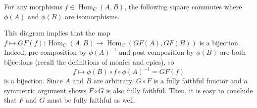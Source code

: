 \documentclass{article}
\theoremstyle{definition}
\theoremstyle{remark}
\DeclareMathOperator{\Hom}{Hom}
\begin{document}
For any morphisms $f \in \Hom_C(A,B)$, the following square commutes where $\phi(A)$ and $\phi(B)$ are isomorphisms.
\begin{figure}[h]
	\centering
\end{figure}

This diagram implies that the map $f \mapsto GF(f):\Hom_C(A,B) \rightarrow \Hom_C(GF(A), GF(B))$ is a bijection. Indeed, pre-composition by $\phi(A)^{-1}$ and post-composition by $\phi(B)$ are both bijections (recall the definitions of monics and epics), so \[f \mapsto \phi(B) \circ f \circ \phi(A)^{-1} = GF(f)\]is a bijection. Since $A$ and $B$ are arbitrary, $G\circ F$ is a fully faithful functor and a symmetric argument shows $F\circ G$ is also fully faithful. Then, it is easy to conclude that $F$ and $G$ must be fully faithful as well.
\end{document}
